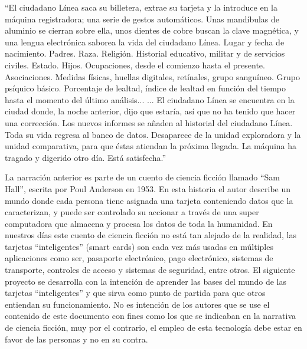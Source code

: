 \begin{prefacio}

\begin{itshape}
“El ciudadano Línea saca su billetera, extrae su tarjeta y la introduce en la máquina registradora; una serie de gestos automáticos. Unas mandíbulas de aluminio se cierran sobre ella, unos dientes de cobre buscan la clave magnética, y una lengua electrónica saborea la vida del ciudadano Línea.
Lugar y fecha de nacimiento. Padres. Raza. Religión. Historial educativo, militar y de servicios civiles. Estado. Hijos. Ocupaciones, desde el comienzo hasta el presente. Asociaciones. Medidas físicas, huellas digitales, retínales, grupo sanguíneo. Grupo psíquico básico. Porcentaje de lealtad, índice de lealtad en función del tiempo hasta el momento del último análisis...
... El ciudadano Línea se encuentra en la ciudad donde, la noche anterior, dijo que estaría, así que no ha tenido que hacer una corrección.
Los nuevos informes se añaden al historial del ciudadano Línea. Toda su vida regresa al banco de datos. Desaparece de la unidad exploradora y la unidad comparativa, para que éstas atiendan la próxima llegada.
La máquina ha tragado y digerido otro día. Está satisfecha.”

\end{itshape}
\bigskip

La narración anterior es parte de un cuento de ciencia ficción llamado “Sam Hall”, escrita por Poul Anderson en 1953. En esta historia el autor describe un mundo donde cada persona tiene asignada una tarjeta conteniendo datos que la caracterizan, y puede ser controlado su accionar a través de una super computadora que almacena y procesa los datos de toda la humanidad. 
En nuestros días este cuento de ciencia ficción no está tan alejado de la realidad, las tarjetas “inteligentes” (smart cards) son cada vez más usadas en múltiples aplicaciones como ser, pasaporte electrónico, pago electrónico, sistemas de transporte, controles de acceso y sistemas de seguridad, entre otros.
El siguiente proyecto se desarrolla con la intención de aprender las bases del mundo de las tarjetas “inteligentes” y que sirva como punto de partida para que otros entiendan su funcionamiento. 
No es intención de los autores que se use el contenido de este documento con fines como los que se indicaban en la narrativa de ciencia ficción, muy por el contrario, el empleo de esta tecnología debe estar en favor de las personas y no en su contra.

\end{prefacio}